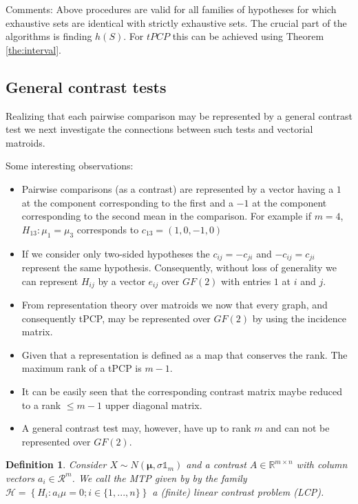\documentclass[a4paper,12pt]{article}
\newtheorem{definition}{Definition}
\newcommand{\bs}[1]{\boldsymbol{#1}}
\begin{document}
Comments: Above procedures are valid for all families of hypotheses
for which exhaustive sets are identical with strictly exhaustive
sets. The crucial part of the algorithms is finding $h(S)$. For $tPCP$
this can be achieved using Theorem \ref{the:interval}.





\subsection{General contrast tests}

Realizing that each pairwise comparison may be represented by a
general contrast test we next investigate the connections between such
tests and vectorial matroids. 

Some interesting observations:
\begin{itemize}
\item Pairwise comparisons (as a contrast) are represented by a vector
  having a $1$ at the component corresponding to the first and a $-1$
  at the component corresponding to the second mean in the
  comparison. For example if $m = 4$, $H_{13}: \mu_1 = \mu_3$
  corresponds to  $c_{13} = (1,0,-1,0)$ 
\item If we consider only two-sided hypotheses the $c_{ij} = -c_{ji}$ and
  $-c_{ij} = c_{ji}$  represent the same hypothesis. Consequently,
  without loss of generality we can represent $H_{ij}$ by a vector
  $e_{ij}$ over $GF(2)$ with entries $1$ at $i$ and $j$.
\item From representation theory over matroids we now that every graph,
  and consequently tPCP, may be represented over $GF(2)$ by using the
  incidence matrix.
\item Given that a representation is defined as a map that conserves
  the rank. The maximum rank of a tPCP is $m-1$.
\item It can be easily seen that the corresponding contrast matrix
  maybe reduced to a rank $\leq m-1$ upper diagonal matrix.
\item A general contrast test may, however, have up to rank $m$ and
  can not be represented over $GF(2)$.
\end{itemize}

\begin{definition}
  Consider $X \sim N(\bs{\mu},\sigma \mathbb{1}_m)$ and a contrast $A
  \in \mathbb{R}^{m \times n}$ with column vectors $a_i \in
  \mathcal{R}^m$. We call the MTP given by by the family $\mathcal{H}
  = \left\{H_i: a_i\mu = 0; i \in \{1,...,n\}\right\}$ a (finite)
  linear  contrast problem (LCP).
\end{definition}
\end{document}
